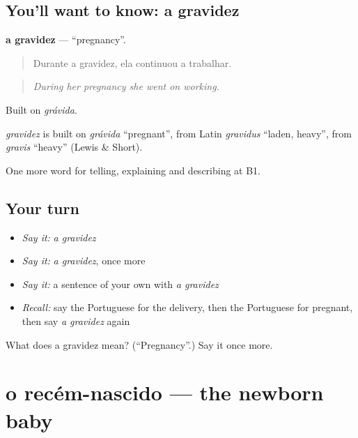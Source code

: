 \subsection*{You'll want to know: a gravidez}
\textbf{a gravidez} — \textquotedblleft{}pregnancy\textquotedblright{}.

\begin{quote}
Durante a gravidez, ela continuou a trabalhar.
\end{quote}

\begin{quote}
\emph{During her pregnancy she went on working.}
\end{quote}

Built on \emph{grávida}.

\begin{cousinweb}
\emph{gravidez} is built on \emph{grávida} \textquotedblleft{}pregnant\textquotedblright{}, from Latin \emph{gravidus} \textquotedblleft{}laden, heavy\textquotedblright{}, from \emph{gravis} \textquotedblleft{}heavy\textquotedblright{} (Lewis \& Short).
\end{cousinweb}

\begin{grammarlens}[title={What you've built}]
One more word for telling, explaining and describing at B1.
\end{grammarlens}

\subsection*{Your turn}
\begin{itemize}
\raggedright
  \item \emph{Say it:} \emph{a gravidez}
  \item \emph{Say it:} \emph{a gravidez}, once more
  \item \emph{Say it:} a sentence of your own with \emph{a gravidez}
  \item \emph{Recall:} say the Portuguese for the delivery, then the Portuguese for pregnant, then say \emph{a gravidez} again
\end{itemize}

\begin{tcolorbox}[breakable,colback=teal!4,colframe=teal!35!black,title={Before you move on}]
What does a gravidez mean? (\textquotedblleft{}Pregnancy\textquotedblright{}.) Say it once more.
\end{tcolorbox}
\section[o recém-nascido]{o recém-nascido — the newborn baby}

